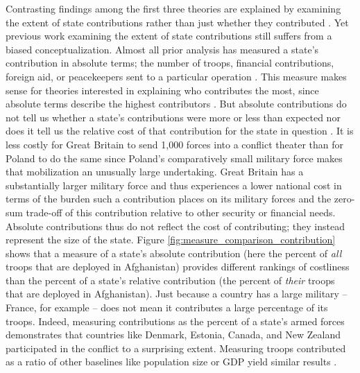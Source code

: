 \documentclass[12pt,letterpaper]{article}
\begin{document}
		Contrasting findings among the first three theories are explained by examining the extent of state contributions rather than just whether they contributed \citep[4]{cranmer_coalitionqualitymultinational_2017}. Yet previous work examining the extent of state contributions still suffers from a biased conceptualization. Almost all prior analysis has measured a state's contribution in absolute terms; the number of troops, financial contributions, foreign aid, or peacekeepers sent to a particular operation \citep{mello_democraticparticipationarmed_2014, haesebrouck_explainingmemberstates_2016}. This measure makes sense for theories interested in explaining who contributes the most, since absolute terms describe the highest contributors \citep[40-41]{bogers_missionafghanistanwho_2013}. But absolute contributions do not tell us whether a state's contributions were more or less than expected nor does it tell us the relative cost of that contribution for the state in question \citep{kreps_eliteconsensusdeterminant_2010}. It is less costly for Great Britain to send 1,000 forces into a conflict theater than for Poland to do the same since Poland's comparatively small military force makes that mobilization an unusually large undertaking. Great Britain has a substantially larger military force and thus experiences a lower national cost in terms of the burden such a contribution places on its military forces and the zero-sum trade-off of this contribution relative to other security or financial needs. Absolute contributions thus do not reflect the cost of contributing; they instead represent the size of the state. Figure \ref{fig:measure_comparison_contribution} shows that a measure of a state's absolute contribution (here the percent of \emph{all} troops that are deployed in Afghanistan) provides different rankings of costliness than the percent of a state's relative contribution (the percent of \textit{their} troops that are deployed in Afghanistan). Just because a country has a large military -- France, for example -- does not mean it contributes a large percentage of its troops. Indeed, measuring contributions as the percent of a state's armed forces demonstrates that countries like Denmark, Estonia, Canada, and New Zealand participated in the conflict to a surprising extent. Measuring troops contributed as a ratio of other baselines like population size or GDP yield similar results \citep[41]{bogers_missionafghanistanwho_2013}.
\end{document}

